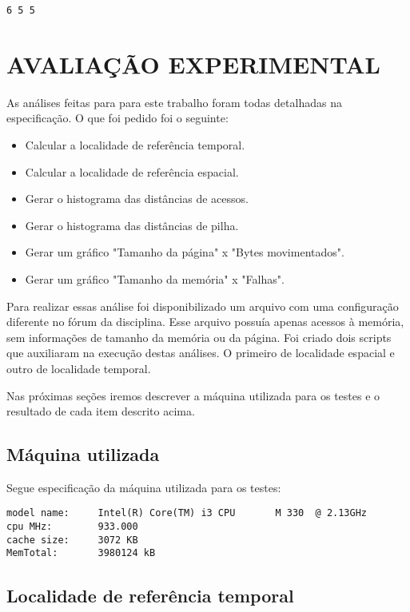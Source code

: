 \documentclass[12pt]{article}
\begin{document}
\begin{verbatim}
6 5 5
\end{verbatim}


\section{AVALIAÇÃO EXPERIMENTAL}
\label{avaliacao_experimental}

As análises feitas para para este trabalho foram todas detalhadas na especificação. O que foi pedido foi o seguinte:

\begin{itemize}
\item Calcular a localidade de referência temporal.
\item Calcular a localidade de referência espacial.
\item Gerar o histograma das distâncias de acessos.
\item Gerar o histograma das distâncias de pilha.
\item Gerar um gráfico "Tamanho da página" x "Bytes movimentados".
\item Gerar um gráfico "Tamanho da memória" x "Falhas".
\end{itemize}

Para realizar essas análise foi disponibilizado um arquivo com uma configuração diferente no fórum da disciplina. Esse arquivo possuía apenas acessos à memória, sem informações de tamanho da memória ou da página. Foi criado dois scripts que auxiliaram na execução destas análises. O primeiro de localidade espacial e outro de localidade temporal.

Nas próximas seções iremos descrever a máquina utilizada para os testes e o resultado de cada item descrito acima.

\subsection{Máquina utilizada}
\label{maquina}

Segue especificação da máquina utilizada para os testes:
\begin{verbatim}
model name:     Intel(R) Core(TM) i3 CPU       M 330  @ 2.13GHz
cpu MHz:        933.000
cache size:     3072 KB
MemTotal:       3980124 kB
\end{verbatim}


\subsection{Localidade de referência temporal}
\label{loc_ref_temp}
\end{document}

